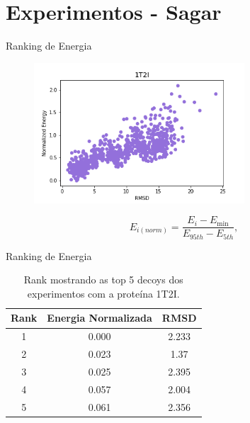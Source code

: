 \documentclass[10pt]{beamer}
\begin{document}
\section{Experimentos - Sagar}

\begin{frame}{Ranking de Energia}
    \begin{figure}
        \centering
        \includegraphics[width=0.7\textwidth]{../images/relatorio/1t2i_tunnel.png}
    \end{figure}
    
    \begin{equation*}
        E_{i(norm)} = \frac{E_i - E_{\min}}{E_{95th} - E_{5th}},
    \end{equation*}
\end{frame}

\begin{frame}{Ranking de Energia}
    \begin{table}[]
    \centering
    \caption{Rank mostrando as top 5 decoys dos experimentos com a proteína 1T2I.}
    \label{tab:protrank}
    \begin{tabular}{@{}ccc@{}}
        \toprule
        Rank & Energia Normalizada & RMSD  \\
        \midrule
        1    & 0.000             & 2.233 \\
        2    & 0.023             & 1.37  \\
        3    & 0.025             & 2.395 \\
        4    & 0.057             & 2.004 \\
        5    & 0.061             & 2.356 \\
        \bottomrule
    \end{tabular}
\end{table}
\end{frame}
\end{document}
